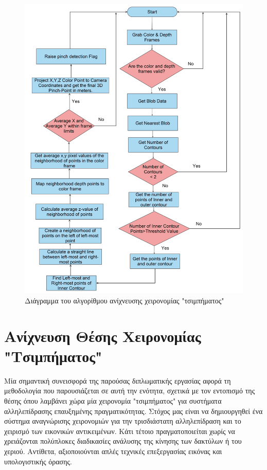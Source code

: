 \begin{figure}[H]
    \centering
    \includegraphics[width=.85\linewidth]{Files/Figures/pinch_gesture_detection.png}
    \caption[Διάγραμμα του αλγορίθμου ανίχνευσης χειρονομίας "τσιμπήματος"]{Διάγραμμα του αλγορίθμου ανίχνευσης χειρονομίας "τσιμπήματος"}
    \label{fig:gesture_rec}
\end{figure}






\section{Ανίχνευση Θέσης Χειρονομίας "Τσιμπήματος"}


Μία σημαντική συνεισφορά της παρούσας διπλωματικής εργασίας αφορά τη μεθοδολογία που παρουσιάζεται σε αυτή την ενότητα, σχετικά με τον εντοπισμό της θέσης όπου λαμβάνει χώρα μία χειρονομία "τσιμπήματος" για συστήματα αλληλεπίδρασης επαυξημένης πραγματικότητας. Στόχος μας είναι να δημιουργηθεί ένα σύστημα αναγνώρισης χειρονομιών για την τρισδιάστατη αλληλεπίδραση και το χειρισμό των εικονικών αντικειμένων. Κάτι τέτοιο πραγματοποιείται χωρίς να χρειάζονται πολύπλοκες διαδικασίες ανάλυσης της κίνησης των δακτύλων ή του χεριού. Αντίθετα, αξιοποιούνται απλές τεχνικές επεξεργασίας εικόνας και υπολογιστικής όρασης.


